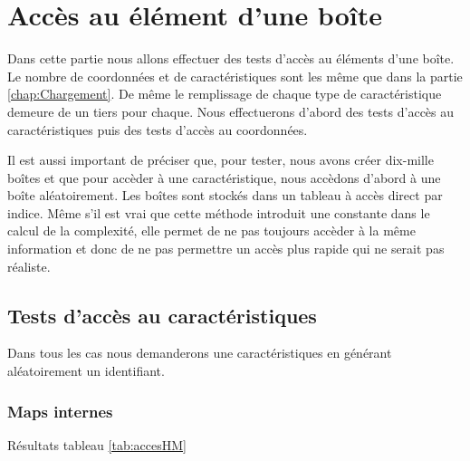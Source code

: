 \chapter{Accès au élément d'une boîte}
Dans cette partie nous allons effectuer des tests d'accès au éléments d'une boîte. Le nombre de coordonnées et de caractéristiques sont les même que dans la partie \ref{chap:Chargement}. De même le remplissage de chaque type de caractéristique demeure de un tiers pour chaque. Nous effectuerons d'abord des tests d'accès au caractéristiques puis des tests d'accès au coordonnées. 

Il est aussi important de préciser que, pour tester, nous avons créer dix-mille boîtes et que pour accèder à une caractéristique, nous accèdons d'abord à une boîte aléatoirement. Les boîtes sont stockés dans un tableau à accès direct par indice. Même s'il est vrai que cette méthode introduit une constante dans le calcul de la complexité, elle permet de ne pas toujours accèder à la même information et donc de ne pas permettre un accès plus rapide qui ne serait pas réaliste.

\section{Tests d'accès au caractéristiques}
Dans tous les cas nous demanderons une caractéristiques en générant aléatoirement un identifiant.

\subsection{Maps internes}
Résultats tableau \ref{tab:accesHM}
